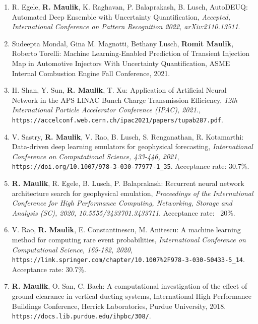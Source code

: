 \documentclass[letterpaper]{article}
\begin{document}
\begin{enumerate}

\item R. Egele, \textbf{R. Maulik}, K. Raghavan, P. Balaprakash, B. Lusch, AutoDEUQ: Automated Deep Ensemble with Uncertainty Quantification, {\it Accepted, International Conference on Pattern Recognition 2022, arXiv:2110.13511}.

\item Sudeepta Mondal, Gina M. Magnotti, Bethany Lusch, \textbf{Romit Maulik}, Roberto Torelli: Machine Learning-Enabled Prediction of Transient Injection Map in Automotive Injectors With Uncertainty Quantification, ASME Internal Combustion Engine Fall Conference, 2021. 

\item H. Shan, Y. Sun, \textbf{R. Maulik}, T. Xu: Application of Artificial Neural Network in the APS LINAC Bunch Charge Transmission Efficiency, {\it 12th International Particle Accelerator Conference (IPAC), 2021.}, \\ \texttt{https://accelconf.web.cern.ch/ipac2021/papers/tupab287.pdf}.

\item V. Sastry, \textbf{R. Maulik}, V. Rao, B. Lusch, S. Renganathan, R. Kotamarthi: Data-driven deep learning emulators for geophysical forecasting, {\it International Conference on Computational Science, 433-446, 2021}, \\ \texttt{https://doi.org/10.1007/978-3-030-77977-1\_35}. Acceptance rate: 30.7\%.

\item \textbf{R. Maulik}, R. Egele, B. Lusch,  P. Balaprakash: Recurrent neural network architecture search for geophysical emulation, {\it Proceedings of the International Conference for High Performance Computing, Networking, Storage and Analysis (SC), 2020, 10.5555/3433701.3433711}. Acceptance rate: ~20\%.

\item V. Rao, \textbf{R. Maulik}, E. Constantinescu, M. Anitescu: A machine learning method for computing rare event probabilities, {\it International Conference on Computational Science, 169-182, 2020}, \\ \texttt{https://link.springer.com/chapter/10.1007\%2F978-3-030-50433-5\_14}. Acceptance rate: 30.7\%.

\item \textbf{R. Maulik}, O. San, C. Bach: A computational investigation of the effect of ground clearance in vertical ducting systems, International High Performance Buildings Conference, Herrick Laboratories, Purdue University, 2018. \\ \texttt{https://docs.lib.purdue.edu/ihpbc/308/}.

\end{enumerate}
\end{document}
